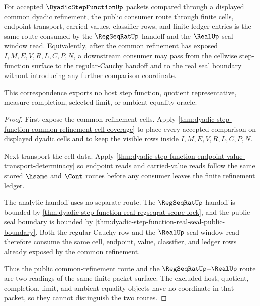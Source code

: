 \begin{theorem}
\label{thm:dyadic-step-function-common-refinement-real-regseq-correspondence}
For accepted $\DyadicStepFunctionUp$ packets compared through a displayed common dyadic refinement, the public consumer route through finite cells, endpoint transport, carried values, classifier rows, and finite ledger entries is the same route consumed by the $\RegSeqRatUp$ handoff and the $\RealUp$ seal-window read. Equivalently, after the common refinement has exposed $I,M,E,V,R,L,C,P,N$, a downstream consumer may pass from the cellwise step-function surface to the regular-Cauchy handoff and to the real seal boundary without introducing any further comparison coordinate.

This correspondence exports no host step function, quotient representative, measure completion, selected limit, or ambient equality oracle.
\end{theorem}
\begin{proof}
First expose the common-refinement cells. Apply \autoref{thm:dyadic-step-function-common-refinement-cell-coverage} to place every accepted comparison on displayed dyadic cells and to keep the visible rows inside $I,M,E,V,R,L,C,P,N$.

Next transport the cell data. Apply \autoref{thm:dyadic-step-function-endpoint-value-transport-determinacy} so endpoint reads and carried-value reads follow the same stored $\hsame$ and $\Cont$ routes before any consumer leaves the finite refinement ledger.

The analytic handoff uses no separate route. The $\RegSeqRatUp$ handoff is bounded by \autoref{thm:dyadic-step-function-real-regseqrat-scope-lock}, and the public seal boundary is bounded by \autoref{thm:dyadic-step-function-real-seal-public-boundary}. Both the regular-Cauchy row and the $\RealUp$ seal-window read therefore consume the same cell, endpoint, value, classifier, and ledger rows already exposed by the common refinement.

Thus the public common-refinement route and the $\RegSeqRatUp$--$\RealUp$ route are two readings of the same finite packet surface. The excluded host, quotient, completion, limit, and ambient equality objects have no coordinate in that packet, so they cannot distinguish the two routes.
\end{proof}

